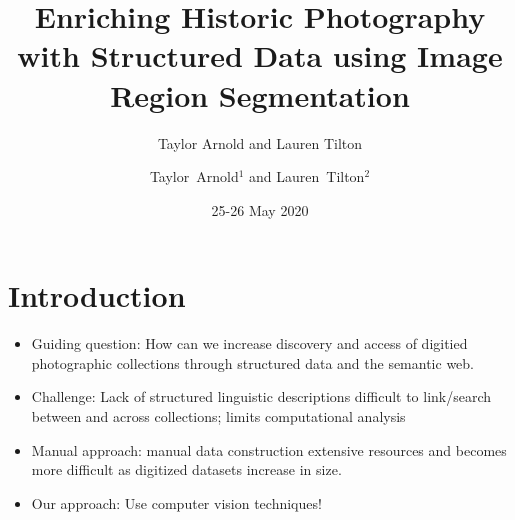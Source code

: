 \documentclass[12pt,ignorenonframetext,aspectratio=169]{beamer}
\title{Enriching Historic Photography with Structured Data
using Image Region Segmentation}
\author{Taylor Arnold and Lauren Tilton}
\date{25-26 May 2020}
\author %
{Taylor~Arnold$^{1}$ and Lauren~Tilton$^{2}$}
\institute[] %
{
  $^{1}$ Assistant Professor of Statistics and Linguistics\\
  University of Richmond\\
  \texttt{statsmaths.github.io}\\

  $^{2}$ Assistant Professor of Digital Humanities\\
  University of Richmond\\
  \texttt{laurentilton.com}\\

}
\makeatletter
\newcommand{\orange}[1]{\textcolor{solarized@orange}{#1}}
\newcommand{\blue}[1]{\textcolor{solarized@blue}{#1}}
\makeatother
\begin{document}



\frame{\titlepage}

%
%
%

\section{Introduction}

\begin{frame}{}

\begin{itemize}
\item \blue{Guiding question}: How can we increase discovery and access of digitied
photographic collections through structured data and the semantic web. \pause
\item \blue{Challenge}: Lack of structured linguistic descriptions \textrightarrow{}
difficult to link/search between and across collections; limits computational analysis \pause
\item \blue{Manual approach}: manual data construction \textrightarrow{}
extensive resources and becomes more difficult as digitized
datasets increase in size. \pause
\item \blue{Our approach}: Use computer vision techniques!
\end{itemize}

\end{frame}
\end{document}
